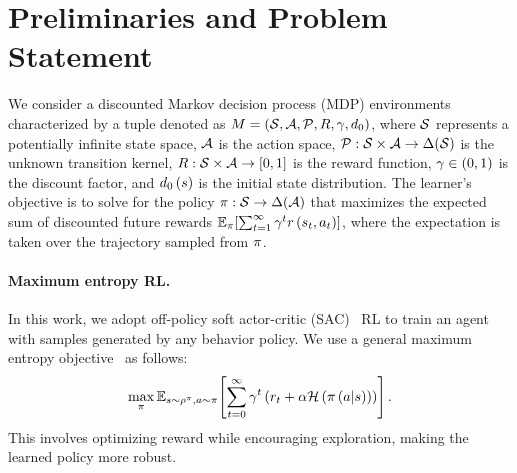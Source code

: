 \section{Preliminaries and Problem Statement}\label{sec:Preliminaries}
\vspace{-0.2cm}

We consider a discounted Markov decision process (MDP) environments~\citep{bellman1957markovian} characterized by a tuple denoted as $M = (\mathcal{S}, \mathcal{A}, \mathcal{P}, R, \gamma, d_0)$, where $\mathcal{S}$ represents a potentially infinite state space, $\mathcal{A}$ is the action space,
$\mathcal{P}: \mathcal{S} \times \mathcal{A} \rightarrow \Delta(\mathcal{S})$ is the unknown transition kernel, %
$R: \mathcal{S} \times \mathcal{A} \rightarrow [0,1]$ is the reward function, $\gamma \in (0,1)$ is the discount factor, and $d_0 \left( {s} \right) $ is the initial state distribution. 
The learner's objective is to solve for the policy $\pi:\mathcal{S} \rightarrow \Delta(\mathcal{A})$ that maximizes the %
expected sum of discounted future rewards $\mathbb{E}_{\pi}\!\left[\sum_{t=1}^{\infty} \gamma^tr \left( {s_t,a_t} \right) \right]$,
where the expectation is taken over the trajectory sampled from $\pi$. %

\paragraph{Maximum entropy RL.} 
In this work, we adopt off-policy soft actor-critic (SAC)~\citep{haarnoja2018soft} RL to train an agent with samples generated by any behavior policy. 
{
We use a general maximum entropy objective~\citep{ziebart2010modeling,haarnoja2018soft,ball2023efficient} as follows:
\begin{equation}\label{eq:maxentRL}
    \max_{\pi} \mathbb{E}_{s\sim\rho^{\pi},{a\sim\pi}}\!\left[\sum_{t=0}^{\infty} \gamma^t \left( {r_t+\alpha \mathcal{H} \left( {\pi \left( {a|s} \right) } \right) } \right) \right].
\end{equation}
This involves optimizing reward while encouraging exploration, making the learned policy more robust.
}

